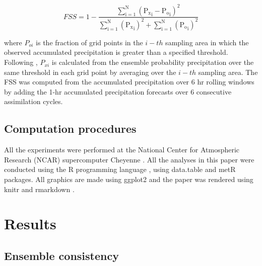 \documentclass[preprint, 3p, authoryear,review, 12pt]{elsarticle} %
\begin{document}
\begin{equation}
  \mathrm{\mathit{FSS} = 1-\frac{\sum_{i=1}^{N} ({P_x}_i-{P_o}_i)^{2}}{\sum_{i=1}^{N} ({P_x}_i)^{2}+\sum_{i=1}^{N} ({P_o}_i)^{2}}}
  \label{eq:eq7}
\end{equation}

where \(P_{oi}\) is the fraction of grid points in the \(i-th\) sampling area in which the observed accumulated precipitation is greater than a specified threshold. Following \citet{roberts2020}, \(P_{xi}\) is calculated from the ensemble probability precipitation over the same threshold in each grid point by averaging over the \(i-th\) sampling area.
The FSS was computed from the accumulated precipitation over 6 hr rolling windows by adding the 1-hr accumulated precipitation forecasts over 6 consecutive assimilation cycles.

\hypertarget{computation-procedures}{%
\subsection{Computation procedures}\label{computation-procedures}}

All the experiments were performed at the National Center for Atmospheric Research (NCAR) supercomputer Cheyenne \citep{Cheyenne2019}. All the analyses in this paper were conducted using the R programming language \citep{rcoreteam2020}, using data.table \citep{dowle2020} and metR \citep{campitelli2020} packages.
All graphics are made using ggplot2 \citep{wickham2009} and the paper was rendered using knitr and rmarkdown \citep{xie2015, allaire2019}.

\hypertarget{results}{%
\section{Results}\label{results}}

\hypertarget{ensemble-consistency}{%
\subsection{Ensemble consistency}\label{ensemble-consistency}}
\end{document}
